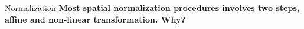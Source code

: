 \documentclass{beamer}
\begin{document}
%
%
%


\begin{frame}{Normalization}
  \textbf{Most spatial normalization procedures involves two steps, affine and non-linear transformation. Why?}

\end{frame}

%
\end{document}
